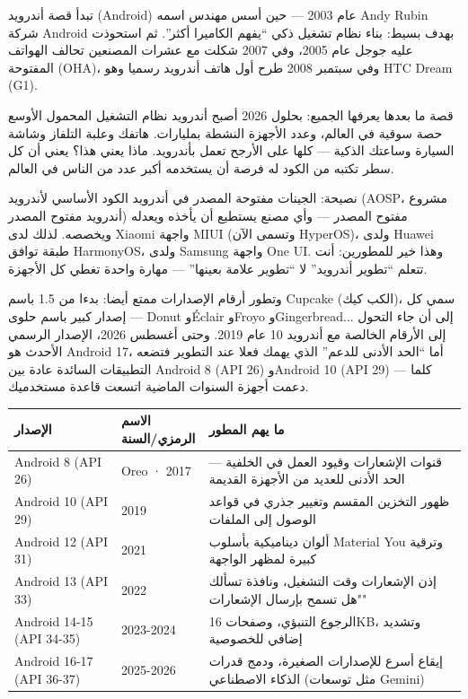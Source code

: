 


تبدأ قصة أندرويد (Android) عام 2003 — حين أسس مهندس اسمه Andy Rubin شركة Android بهدف بسيط: بناء نظام تشغيل ذكي “يفهم الكاميرا أكثر”. ثم استحوذت عليه جوجل عام 2005، وفي 2007 شكلت مع عشرات المصنعين تحالف الهواتف المفتوحة (OHA)، وفي سبتمبر 2008 طرح أول هاتف أندرويد رسميا وهو HTC Dream (G1).

قصة ما بعدها يعرفها الجميع: بحلول 2026 أصبح أندرويد نظام التشغيل المحمول الأوسع حصة سوقية في العالم، وعدد الأجهزة النشطة بمليارات. هاتفك وعلبة التلفاز وشاشة السيارة وساعتك الذكية — كلها على الأرجح تعمل بأندرويد. ماذا يعني هذا؟ يعني أن كل سطر تكتبه من الكود له فرصة أن يستخدمه أكبر عدد من الناس في العالم.

\begin{tcbinfo}{نصيحة: الجينات مفتوحة المصدر في أندرويد}
الكود الأساسي لأندرويد (AOSP، مشروع أندرويد مفتوح المصدر) مفتوح المصدر — وأي مصنع يستطيع أن يأخذه ويعدله ويخصصه. لذلك لدى Xiaomi واجهة MIUI (وتسمى الآن HyperOS)، ولدى Huawei طبقة توافق HarmonyOS، ولدى Samsung واجهة One UI. وهذا خير للمطورين: أنت تتعلم “تطوير أندرويد” لا “تطوير علامة بعينها” — مهارة واحدة تغطي كل الأجهزة.

\end{tcbinfo}

وتطور أرقام الإصدارات ممتع أيضا: بدءا من 1.5 باسم Cupcake (الكب كيك)، سمي كل إصدار كبير باسم حلوى — Donut وÉclair وFroyo وGingerbread... إلى أن جاء التحول إلى الأرقام الخالصة مع أندرويد 10 عام 2019. وحتى أغسطس 2026، الإصدار الرسمي الأحدث هو Android 17، أما “الحد الأدنى للدعم” الذي يهمك فعلا عند التطوير فتضعه التطبيقات السائدة عادة بين Android 8 (API 26) وAndroid 10 (API 29) — كلما دعمت أجهزة السنوات الماضية اتسعت قاعدة مستخدميك.

\begin{center}
\begin{tabularx}{\linewidth}{|X|X|X|}
\hline
\textbf{الإصدار} & \textbf{الاسم الرمزي/السنة} & \textbf{ما يهم المطور} \tabularnewline
\hline
Android 8 (API 26) & Oreo · 2017 & قنوات الإشعارات وقيود العمل في الخلفية — الحد الأدنى للعديد من الأجهزة القديمة \tabularnewline
Android 10 (API 29) & 2019 & ظهور التخزين المقسم وتغيير جذري في قواعد الوصول إلى الملفات \tabularnewline
Android 12 (API 31) & 2021 & ألوان ديناميكية بأسلوب Material You وترقية كبيرة لمظهر الواجهة \tabularnewline
Android 13 (API 33) & 2022 & إذن الإشعارات وقت التشغيل، ونافذة تسألك "هل تسمح بإرسال الإشعارات" \tabularnewline
Android 14-15 (API 34-35) & 2023-2024 & الرجوع التنبؤي، وصفحات 16KB، وتشديد إضافي للخصوصية \tabularnewline
Android 16-17 (API 36-37) & 2025-2026 & إيقاع أسرع للإصدارات الصغيرة، ودمج قدرات الذكاء الاصطناعي (مثل توسعات Gemini) \tabularnewline
\hline
\end{tabularx}
\end{center}

